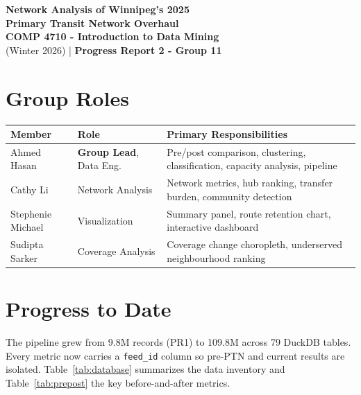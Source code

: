 \documentclass[11pt]{article}
\begin{document}
\small
\begin{center}
    {\LARGE \textbf{Network Analysis of Winnipeg's 2025\\Primary Transit Network Overhaul}}\\[0.4em]
    {\large \textbf{COMP 4710 - Introduction to Data Mining}}\\
    {\large (Winter 2026) | \textbf{Progress Report 2 - Group 11}}
\end{center}
\thispagestyle{fancy}

\vspace{-0.3em}

\section{Group Roles}

\begin{table}[H]
\centering
\footnotesize
\begin{tabularx}{\textwidth}{l l X}
\toprule
\textbf{Member} & \textbf{Role} & \textbf{Primary Responsibilities} \\
\midrule
Ahmed Hasan & \textbf{Group Lead}, Data Eng. & Pre/post comparison, clustering, classification, capacity analysis, pipeline \\
Cathy Li & Network Analysis & Network metrics, hub ranking, transfer burden, community detection \\
Stephenie Michael & Visualization & Summary panel, route retention chart, interactive dashboard \\
Sudipta Sarker & Coverage Analysis & Coverage change choropleth, underserved neighbourhood ranking \\
\bottomrule
\end{tabularx}
\end{table}

\vspace{-0.3em}

\section{Progress to Date}

The pipeline grew from 9.8M records (PR1) to 109.8M across 79 DuckDB tables. Every metric now carries a \texttt{feed\_id} column so pre-PTN and current results are isolated. Table~\ref{tab:database} summarizes the data inventory and Table~\ref{tab:prepost} the key before-and-after metrics.
\end{document}
